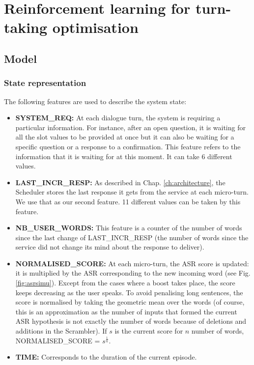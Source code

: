 \chapter{Reinforcement learning for turn-taking optimisation}
\label{ch:rl}

\section{Model}

	\subsection{State representation}
    
    	The following features are used to describe the system state:
        
        \begin{itemize}
        	\item \textbf{SYSTEM\_REQ:} At each dialogue turn, the system is requiring a particular information. For instance, after an open question, it is waiting for all the slot values to be provided at once but it can also be waiting for a specific question or a response to a confirmation. This feature refers to the information that it is waiting for at this moment. It can take 6 different values.
            \item \textbf{LAST\_INCR\_RESP:} As described in Chap. \ref{ch:architecture}, the Scheduler stores the last response it gets from the service at each micro-turn. We use that as our second feature. 11 different values can be taken by this feature.
            \item \textbf{NB\_USER\_WORDS:} This feature is a counter of the number of words since the last change of LAST\_INCR\_RESP (the number of words since the service did not change its mind about the response to deliver).
            \item \textbf{NORMALISED\_SCORE:} At each micro-turn, the ASR score is updated: it is multiplied by the ASR corresponding to the new incoming word (see Fig. \ref{fig:asrsimu}). Except from the cases where a boost takes place, the score keeps decreasing as the user speaks. To avoid penalising long sentences, the score is normalised by taking the geometric mean over the words (of course, this is an approximation as the number of inputs that formed the current ASR hypothesis is not exactly the number of words because of deletions and additions in the Scrambler). If $s$ is the current score for $n$ number of words, NORMALISED\_SCORE = $s^{\frac{1}{n}}$.
            \item \textbf{TIME:} Corresponds to the duration of the current episode.
        \end{itemize}
        
